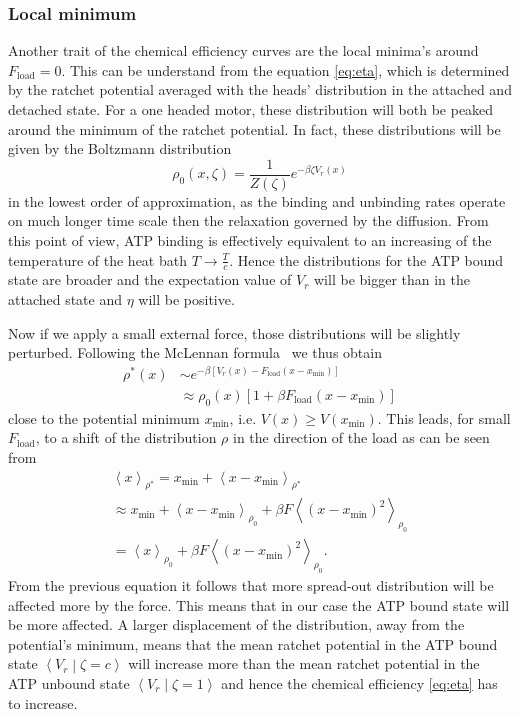 \documentclass[aps,pre,twocolumn,showpacs,showkeys,superscriptaddress,floatfix]{revtex4-1}
\begin{document}
\subsubsection{Local minimum}
Another trait of the chemical efficiency curves are the local minima's around $F_\text{load}=0$. 
This can be understand from the equation \eqref{eq:eta}, which is determined by the ratchet potential averaged with the heads' distribution in the attached and detached state. 
For a one headed motor, these distribution will both be peaked around the minimum of the ratchet potential. 
In fact, these distributions will be given by the Boltzmann distribution
\begin{equation}
\rho_0(x,\zeta) = \frac{1}{Z(\zeta)} e^{-\beta \zeta V_r(x)}
\end{equation} 
in the lowest order of approximation, as the binding and unbinding rates operate on much longer time scale then the relaxation governed by the diffusion. 
From this point of view, ATP binding is effectively equivalent to an increasing of the temperature of the heat bath $T\rightarrow\frac{T}{c}$. 
Hence the distributions for the ATP bound state are broader and the expectation value of $V_r$ will be bigger than in the attached state and $\eta$ will be positive. 

Now if we apply a small external force, those distributions will be slightly perturbed. 
Following the McLennan formula~\cite{} we thus obtain %
\begin{align*}
\rho^*(x) 
&\sim e^{-\beta \left[V_r(x) - F_\text{load} \left( x - x_\text{min} \right) \right]} \\
&\approx \rho_0(x) \left[1 + \beta F_\text{load} \left( x - x_\text{min} \right) \right]
\end{align*}
close to the potential minimum $x_\text{min}$, i.e. $V(x) \ge V(x_\text{min})$. 
This leads, for small $F_\text{load}$, to a shift of the distribution $\rho$ in the direction of the load
as can be seen from 
\begin{multline}
\left\langle x \right\rangle_{\rho^*} 
= x_\text{min} + \left\langle x - x_\text{min} \right\rangle_{\rho^*}
\\
\approx x_\text{min} + \left\langle x - x_\text{min} \right\rangle_{\rho_0} 
+ \beta F \left\langle \left( x - x_\text{min} \right)^2 \right\rangle_{\rho_0} 
\\
= \left\langle x \right\rangle_{\rho_0}
+ \beta F \left\langle \left( x - x_\text{min} \right)^2 \right\rangle_{\rho_0} .
\label{eq:mean_position_shift}
\end{multline}
From the previous equation it follows that more spread-out distribution will be affected more by the force.
This means that in our case the ATP bound state will be more affected.
A larger displacement of the distribution, away from the potential's minimum, 
means that the mean ratchet potential in the ATP bound state $\left\langle V_r \middle| \zeta = c \right\rangle$ will increase more than the mean ratchet potential in the ATP unbound state $\left\langle V_r \middle| \zeta = 1 \right\rangle$ and hence the chemical efficiency \eqref{eq:eta} has to increase. 
\end{document}
